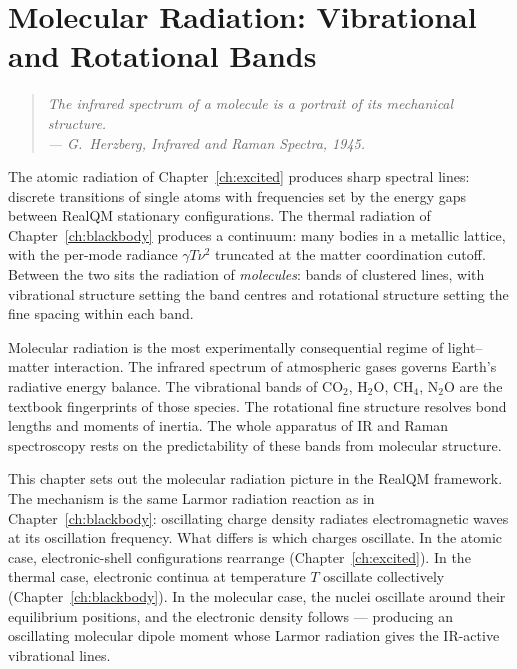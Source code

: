 \chapter{Molecular Radiation: Vibrational and Rotational Bands}\label{ch:molrad}

\begin{quote}
\itshape The infrared spectrum of a molecule is a portrait of its mechanical structure.\\
\normalfont\hfill --- G.~Herzberg, \emph{Infrared and Raman Spectra}, 1945.
\end{quote}
\bigskip

The atomic radiation of Chapter~\ref{ch:excited} produces sharp spectral lines: discrete transitions of single atoms with frequencies set by the energy gaps between RealQM stationary configurations. The thermal radiation of Chapter~\ref{ch:blackbody} produces a continuum: many bodies in a metallic lattice, with the per-mode radiance $\gamma T \nu^2$ truncated at the matter coordination cutoff. Between the two sits the radiation of \emph{molecules}: bands of clustered lines, with vibrational structure setting the band centres and rotational structure setting the fine spacing within each band.

Molecular radiation is the most experimentally consequential regime of light--matter interaction. The infrared spectrum of atmospheric gases governs Earth's radiative energy balance. The vibrational bands of CO$_2$, H$_2$O, CH$_4$, N$_2$O are the textbook fingerprints of those species. The rotational fine structure resolves bond lengths and moments of inertia. The whole apparatus of IR and Raman spectroscopy rests on the predictability of these bands from molecular structure.

This chapter sets out the molecular radiation picture in the RealQM framework. The mechanism is the same Larmor radiation reaction as in Chapter~\ref{ch:blackbody}: oscillating charge density radiates electromagnetic waves at its oscillation frequency. What differs is which charges oscillate. In the atomic case, electronic-shell configurations rearrange (Chapter~\ref{ch:excited}). In the thermal case, electronic continua at temperature $T$ oscillate collectively (Chapter~\ref{ch:blackbody}). In the molecular case, the nuclei oscillate around their equilibrium positions, and the electronic density follows --- producing an oscillating molecular dipole moment whose Larmor radiation gives the IR-active vibrational lines.


